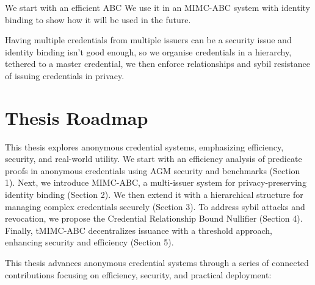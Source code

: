 We start with an efficient ABC
We use it in an MIMC-ABC system with identity binding to show how it will be used in the future.

Having multiple credentials from multiple issuers can be a security issue and identity binding isn't good enough, so we organise credentials in a hierarchy, tethered to a master credential, we then enforce relationships and sybil resistance of issuing credentials in privacy. 



\section*{Thesis Roadmap}

This thesis explores anonymous credential systems, emphasizing efficiency, security, and real-world utility. We start with an efficiency analysis of predicate proofs in anonymous credentials using AGM security and benchmarks (Section 1). Next, we introduce MIMC-ABC, a multi-issuer system for privacy-preserving identity binding (Section 2). We then extend it with a hierarchical structure for managing complex credentials securely (Section 3). To address sybil attacks and revocation, we propose the Credential Relationship Bound Nullifier (Section 4). Finally, tMIMC-ABC decentralizes issuance with a threshold approach, enhancing security and efficiency (Section 5).


This thesis advances anonymous credential systems through a series of connected contributions focusing on efficiency, security, and practical deployment:

